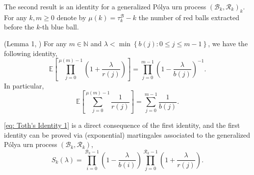 \documentclass[EJP]{ejpecp} %
\begin{document}
The second result is an identity for a generalized P\'{o}lya urn process $(\mathcal{B}_{k},\mathcal{R}_{k})_k$. For any $k,m\geq 0$ denote by $\mu(k)= \tau^{\mathcal{B}}_k - k$ the number of red balls extracted before the $k$-th blue ball. 
\begin{lemma}(Lemma 1, \cite{T96}) \label{lm: Toth's Identity}
	For any $m\in \mathbb{N}$ and $\lambda < \min\left\{ b(j): 0\leq j\leq m-1 \right\}$, we have the following identity,
	$$  \mathbb{E}\left[  \prod_{j=0}^{ \mu(m)-1 } \left(1+ \frac{\lambda}{r(j)}   \right) \right] =   \prod_{j=0}^{ m-1 } \left(1- \frac{\lambda}{b(j)}   \right)^{-1}.   $$ 
	In particular, 
	\begin{equation}\label{eq: Toth's Identity 1}
		\mathbb{E}\left[  \sum_{j=0}^{ \mu(m)-1 } \frac{1}{r(j)}   \right] =   \sum_{j=0}^{ m-1 } \frac{1}{b(j)}.
	\end{equation}	
\end{lemma}
\eqref{eq: Toth's Identity 1} is a direct consequence of the first identity, and the first identity can be proved via (exponential) martingales associated to the generalized P\'{o}lya urn process $(\mathcal{B}_{k},\mathcal{R}_{k})$, 
\[
S_k(\lambda) = \prod_{i=0}^{ \mathcal{B}_{k}-1 } \left(1-\frac{\lambda}{b(i)}\right) \prod_{j=0}^{\mathcal{R}_{k}-1 } \left(1+\frac{\lambda}{r(j)}\right)
.\]
\end{document}
